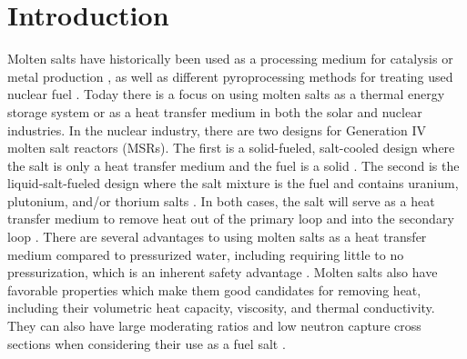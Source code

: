 \documentclass[review]{elsarticle}
\begin{document}

\section{Introduction}
Molten salts have historically been used as a processing medium for catalysis \cite{JIN20202382, HU20204244} or metal production \cite{Zhu2014, VAHIDI2018178}, as well as different pyroprocessing methods for treating used nuclear fuel \cite{CHOI2015572, osti_22107867}. Today there is a focus on using molten salts as a thermal energy storage system or as a heat transfer medium in both the solar and nuclear industries. In the nuclear industry, there are two designs for Generation IV molten salt reactors (MSRs). The first is a solid-fueled, salt-cooled design where the salt is only a heat transfer medium and the fuel is a solid \cite{doi:10.13182/NSE90-374}. The second is the liquid-salt-fueled design where the salt mixture is the fuel and contains uranium, plutonium, and/or thorium salts \cite{doi:10.1080/00295450.2019.1586372}. In both cases, the salt will serve as a heat transfer medium to remove heat out of the primary loop and into the secondary loop \cite{gakhar2021molten}. There are several advantages to using molten salts as a heat transfer medium compared to pressurized water, including requiring little to no pressurization, which is an inherent safety advantage \cite{leblanc2017integral}. Molten salts also have favorable properties which make them good candidates for removing heat, including their volumetric heat capacity, viscosity, and thermal conductivity. They can also have large moderating ratios and low neutron capture cross sections when considering their use as a fuel salt \cite{williams2006assessment}.
\end{document}
